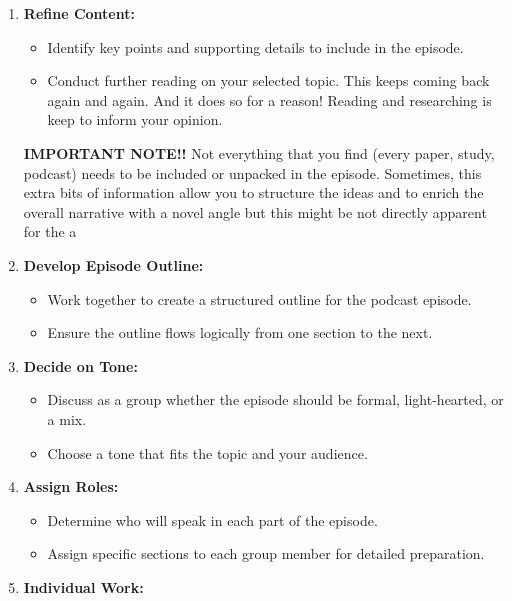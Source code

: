 \documentclass[
  letterpaper,
  DIV=11,
  numbers=noendperiod]{scrreprt}
\providecommand{\tightlist}{%
  \setlength{\itemsep}{0pt}\setlength{\parskip}{0pt}}\usepackage{longtable,booktabs,array}
\begin{document}
\begin{enumerate}
\def\labelenumi{\arabic{enumi}.}
\item
  \textbf{Refine Content:}

  \begin{itemize}
  \tightlist
  \item
    Identify key points and supporting details to include in the
    episode.
  \item
    Conduct further reading on your selected topic. This keeps coming
    back again and again. And it does so for a reason! Reading and
    researching is keep to inform your opinion.
  \end{itemize}

  \textbf{IMPORTANT NOTE!!} Not everything that you find (every paper,
  study, podcast) needs to be included or unpacked in the episode.
  Sometimes, this extra bits of information allow you to structure the
  ideas and to enrich the overall narrative with a novel angle but this
  might be not directly apparent for the a
\item
  \textbf{Develop Episode Outline:}

  \begin{itemize}
  \tightlist
  \item
    Work together to create a structured outline for the podcast
    episode.
  \item
    Ensure the outline flows logically from one section to the next.
  \end{itemize}
\item
  \textbf{Decide on Tone:}

  \begin{itemize}
  \tightlist
  \item
    Discuss as a group whether the episode should be formal,
    light-hearted, or a mix.
  \item
    Choose a tone that fits the topic and your audience.
  \end{itemize}
\item
  \textbf{Assign Roles:}

  \begin{itemize}
  \tightlist
  \item
    Determine who will speak in each part of the episode.
  \item
    Assign specific sections to each group member for detailed
    preparation.
  \end{itemize}
\item
  \textbf{Individual Work:}


\end{enumerate}
\end{document}
